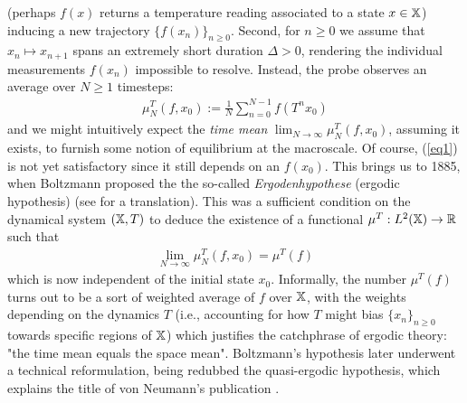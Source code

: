 \documentclass[11pt]{report}
\newcommand{\1}[1]{\mathbbm{1}_{\{#1\}}}
\theoremstyle{definition}
\begin{document}
    (perhaps $f(x)$ returns a temperature reading associated to a state
    $x\in\mathbb{X}$) inducing a new trajectory $\{f(x_n)\}_{n\geq 0}$. Second, for
    $n\geq 0$ we assume that $x_n\mapsto x_{n+1}$ spans an extremely short
    duration $\Delta>0$, rendering the individual measurements $f(x_n)$
    impossible to resolve. Instead, the probe observes an average over $N\geq 1$
    timesteps:
    \begin{align}
        \mu_N^T(f,x_0):=\frac{1}{N}\sum_{n=0}^{N-1}f(T^nx_0)\label{eq1}
    \end{align}
    and we might intuitively expect the \textit{time mean}
    $\lim_{N\rightarrow\infty}\mu^T_N(f,x_0)$, assuming it exists, to furnish
    some notion of equilibrium at the macroscale. Of course, (\ref{eq1}) is not
    yet satisfactory since it still depends on an $f(x_0)$. This brings us to
    1885, when Boltzmann proposed the the so-called \textit{Ergodenhypothese}
    (ergodic hypothesis) \cite{Hasenöhrl_Boltzmann_2012} (see
    \cite{Boltzmann_2019} for a translation). This was a sufficient condition on
    the dynamical system $(\mathbb{X},T)$ to deduce the existence of a functional
    $\mu^T:L^2(\mathbb{X})\rightarrow\mathbb{R}$ such that
    \begin{align}
        \lim_{N\rightarrow\infty}\mu_N^T(f,x_0)=\mu^T(f)\label{eq2}
    \end{align}
    which is now independent of the initial state $x_0$. Informally, the number
    $\mu^T(f)$ turns out to be a sort of weighted average of $f$ over $\mathbb{X}$,
    with the weights depending on the dynamics $T$ (i.e., accounting for how $T$
    might bias $\{x_n\}_{n\geq 0}$ towards specific regions of $\mathbb{X}$) which
    justifies the catchphrase of ergodic theory: "the time mean equals the space
    mean". Boltzmann's hypothesis later underwent a technical reformulation,
    being redubbed the quasi-ergodic hypothesis, which explains the title of von
    Neumann's publication \cite{Neumann_1932}. 
\end{document}
